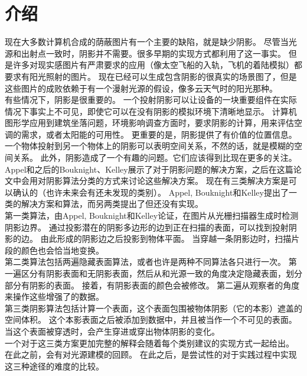 \section{介绍}
现在大多数计算机合成的荫蔽图片有一个主要的缺陷，就是缺少阴影。
尽管当光源和出射点一致时，阴影并不需要。很多早期的实现方式都利用了这一事实。
但是许多对现实感图片有严肃要求的应用（像太空飞船的入轨，飞机的着陆模拟）都要求有阳光照射的图片。
现在已经可以生成包含阴影的很真实的场景图了，但是这些图片的成败依赖于有一个漫射光源的假设，像多云天气时的阳光那种。\\
有些情况下，阴影是很重要的。
一个投射阴影可以让设备的一块重要组件在实际情况下事实上不可见，即使它可以在没有阴影的模拟环境下清晰地显示。
计算机图形学应用到建筑坐落问题，环境影响调查方面时，要求阴影的计算，用来评估空调的需求，或者太阳能的可用性。
更重要的是，阴影提供了有价值的位置信息。一个物体投射到另一个物体上的阴影可以表明空间关系，不然的话，就是模糊的空间关系。
此外，阴影造成了一个有趣的问题。它们应该得到比现在更多的关注。\\
Appel\cite{3}和之后的Bouknight、Kelley\cite{5}展示了对于阴影问题的解决方案，之后在这篇论文中会用对阴影算法分类的方式来讨论这些解决方案。
现在有三类解决方案是可以确认的（也许未来会有还未发现的类别）。
Appel, Bouknight和Kelley提出了一类的解决方案和算法，而另两类提出了但还没有实现。\\
第一类算法，由Appel, Bouknight和Kelley论证，在图片从光栅扫描器生成时检测阴影边界。
通过投影潜在的阴影多边形的边到正在扫描的表面，可以找到投射阴影的边。
由此形成的阴影边之后投影到物体平面。
当穿越一条阴影边时，扫描片段的颜色也会恰当地变换。\\
第二类算法包括两遍隐藏表面算法，或者也许是两种不同算法各只进行一次。
第一遍区分有阴影表面和无阴影表面，然后从和光源一致的角度决定隐藏表面，划分部分有阴影的表面。
接着，有阴影表面的颜色会被修改。
第二遍从观察者的角度来操作这些增强了的数据。\\
第三类阴影算法包括计算一个表面，这个表面包围被物体阴影（它的本影）遮盖的空间体积。
这个本影表面之后被添加到数据中，并且被当作一个不可见的表面。当这个表面被穿透时，会产生穿进或穿出物体阴影的变化。\\
一个对于这三类方案更加完整的解释会随着每个类别建议的实现方式一起给出。
在此之前，会有对光源建模的回顾。
在此之后，是尝试性的对于实践过程中实现这三种途径的难度的比较。